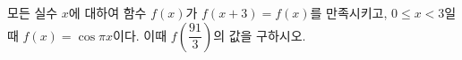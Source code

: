 모든 실수 $x$에 대하여 함수 $f(x)$가 $f(x+3)=f(x)$를 만족시키고, $0\le x<3$일 때 $f(x)=\cos\pi x$이다. 이때 $f\left(\dfrac{91}{3}\right)$의 값을 구하시오.

